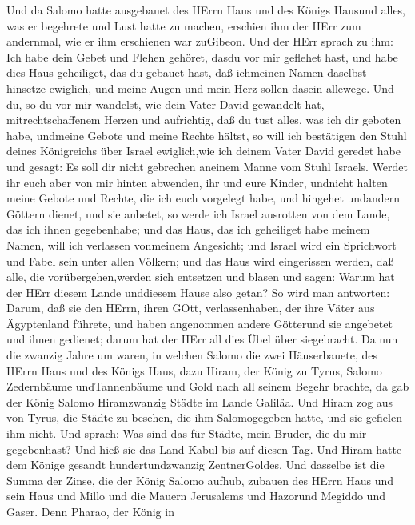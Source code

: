  Und da Salomo hatte ausgebauet des HErrn Haus und des
Königs Hausund alles, was er begehrete und Lust hatte zu machen,
 erschien ihm der HErr zum andernmal, wie er ihm erschienen
war zuGibeon.  Und der HErr sprach zu ihm: Ich habe dein
Gebet und Flehen gehöret, dasdu vor mir geflehet hast, und habe dies
Haus geheiliget, das du gebauet hast, daß ichmeinen Namen daselbst
hinsetze ewiglich, und meine Augen und mein Herz sollen dasein allewege.
 Und du, so du vor mir wandelst, wie dein Vater David
gewandelt hat, mitrechtschaffenem Herzen und aufrichtig, daß du tust
alles, was ich dir geboten habe, undmeine Gebote und meine Rechte
hältst,  so will ich bestätigen den Stuhl deines Königreichs
über Israel ewiglich,wie ich deinem Vater David geredet habe und gesagt:
Es soll dir nicht gebrechen aneinem Manne vom Stuhl Israels.
 Werdet ihr euch aber von mir hinten abwenden, ihr und eure
Kinder, undnicht halten meine Gebote und Rechte, die ich euch vorgelegt
habe, und hingehet undandern Göttern dienet, und sie anbetet,
 so werde ich Israel ausrotten von dem Lande, das ich ihnen
gegebenhabe; und das Haus, das ich geheiliget habe meinem Namen, will
ich verlassen vonmeinem Angesicht; und Israel wird ein Sprichwort und
Fabel sein unter allen Völkern;  und das Haus wird
eingerissen werden, daß alle, die vorübergehen,werden sich entsetzen und
blasen und sagen: Warum hat der HErr diesem Lande unddiesem Hause also
getan?  So wird man antworten: Darum, daß sie den HErrn,
ihren GOtt, verlassenhaben, der ihre Väter aus Ägyptenland führete, und
haben angenommen andere Götterund sie angebetet und ihnen gedienet;
darum hat der HErr all dies Übel über siegebracht.  Da nun
die zwanzig Jahre um waren, in welchen Salomo die zwei Häuserbauete, des
HErrn Haus und des Königs Haus,  dazu Hiram, der König zu
Tyrus, Salomo Zedernbäume undTannenbäume und Gold nach all seinem Begehr
brachte, da gab der König Salomo Hiramzwanzig Städte im Lande Galiläa.
 Und Hiram zog aus von Tyrus, die Städte zu besehen, die
ihm Salomogegeben hatte, und sie gefielen ihm nicht.  Und
sprach: Was sind das für Städte, mein Bruder, die du mir gegebenhast?
Und hieß sie das Land Kabul bis auf diesen Tag.  Und Hiram
hatte dem Könige gesandt hundertundzwanzig ZentnerGoldes. 
Und dasselbe ist die Summa der Zinse, die der König Salomo aufhub,
zubauen des HErrn Haus und sein Haus und Millo und die Mauern Jerusalems
und Hazorund Megiddo und Gaser.  Denn Pharao, der König in
